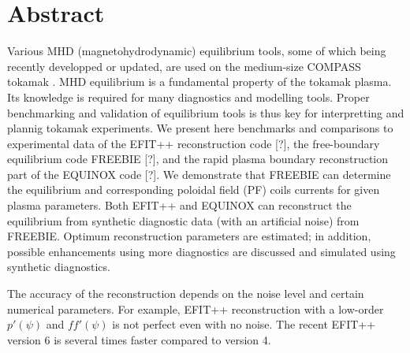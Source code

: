 \section{Abstract}

Various MHD (magnetohydrodynamic) equilibrium tools, some of which being recently developped or updated, are used on the medium-size COMPASS tokamak \cite{doi:10.1007/s10582-006-0188-1}. MHD equilibrium is a fundamental property of the tokamak plasma. Its knowledge is required for many diagnostics and modelling tools. Proper benchmarking and validation of equilibrium tools is thus key for interpretting and plannig tokamak experiments. We present here benchmarks and comparisons to experimental data of the EFIT++ reconstruction code [?], the free-boundary equilibrium code FREEBIE [?], and the rapid plasma boundary reconstruction part of the EQUINOX code [?]. We demonstrate that FREEBIE can determine the equilibrium and corresponding poloidal field (PF) coils currents for given plasma parameters. Both EFIT++ and EQUINOX can reconstruct the equilibrium from synthetic diagnostic data (with an artificial noise) from FREEBIE. Optimum reconstruction parameters are estimated; in addition, possible enhancements using more diagnostics are discussed and simulated using synthetic diagnostics.

The accuracy of the reconstruction depends on the noise level and certain numerical parameters. For example, EFIT++ reconstruction with a low-order $p'\left(\psi\right)$ and $ff'\left(\psi\right)$ is not perfect even with no noise. The recent EFIT++ version 6 is several times faster compared to version 4.
